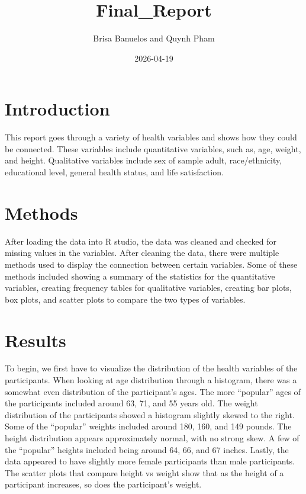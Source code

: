 \documentclass[
]{article}
\title{Final\_Report}
\author{Brisa Banuelos and Quynh Pham}
\date{2026-04-19}
\begin{document}
\maketitle

\section{Introduction}\label{introduction}

This report goes through a variety of health variables and shows how
they could be connected. These variables include quantitative variables,
such as, age, weight, and height. Qualitative variables include sex of
sample adult, race/ethnicity, educational level, general health status,
and life satisfaction.

\section{Methods}\label{methods}

After loading the data into R studio, the data was cleaned and checked
for missing values in the variables. After cleaning the data, there were
multiple methods used to display the connection between certain
variables. Some of these methods included showing a summary of the
statistics for the quantitative variables, creating frequency tables for
qualitative variables, creating bar plots, box plots, and scatter plots
to compare the two types of variables.

\section{Results}\label{results}

To begin, we first have to visualize the distribution of the health
variables of the participants. When looking at age distribution through
a histogram, there was a somewhat even distribution of the participant's
ages. The more ``popular'' ages of the participants included around 63,
71, and 55 years old. The weight distribution of the participants showed
a histogram slightly skewed to the right. Some of the ``popular''
weights included around 180, 160, and 149 pounds. The height
distribution appears approximately normal, with no strong skew. A few of
the ``popular'' heights included being around 64, 66, and 67 inches.
Lastly, the data appeared to have slightly more female participants than
male participants. The scatter plots that compare height vs weight show
that as the height of a participant increases, so does the participant's
weight.
\end{document}
